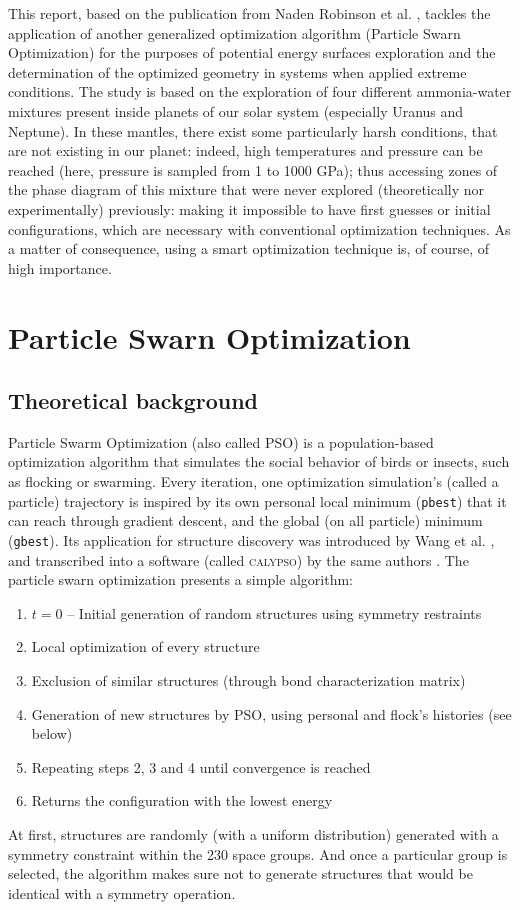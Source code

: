 \documentclass[11pt]{article}
\begin{document}
\begin{multicols}{2}
This report, based on the publication from Naden Robinson et al. \cite{original}, tackles the application of another generalized optimization algorithm (Particle Swarn Optimization) for the purposes of potential energy surfaces exploration and the determination of the optimized geometry in systems when applied extreme conditions. The study is based on the exploration of four different ammonia-water mixtures present inside planets of our solar system (especially Uranus and Neptune). In these mantles, there exist some particularly harsh conditions, that are not existing in our planet: indeed, high temperatures and pressure can be reached (here, pressure is sampled from 1 to 1000 GPa); thus accessing zones of the phase diagram of this mixture that were never explored (theoretically nor experimentally) previously: making it impossible to have first guesses or initial configurations, which are necessary with conventional optimization techniques. As a matter of consequence, using a smart optimization technique is, of course, of high importance.

\section*{Particle Swarn Optimization}
\subsection*{Theoretical background}
Particle Swarm Optimization (also called PSO) is a population-based optimization algorithm that simulates the social behavior of birds or insects, such as flocking or swarming. Every iteration, one optimization simulation's (called a particle) trajectory is inspired by its own personal local minimum (\verb+pbest+) that it can reach through gradient descent, and the global (on all particle) minimum (\verb+gbest+). Its application for structure discovery was introduced by Wang et al. \cite{PhysRevB.82.094116}, and transcribed into a software (called \textsc{calypso}) by the same authors \cite{WANG20122063}. The particle swarn optimization presents a simple algorithm:
\begin{enumerate}
\itemsep0em
    \item $t=0$ -- Initial generation of random structures using symmetry restraints
    \item Local optimization of every structure
    \item Exclusion of similar structures (through bond characterization matrix)
    \item Generation of new structures by PSO, using personal and flock's histories (see below)
    \item Repeating steps 2, 3 and 4 until convergence is reached
    \item Returns the configuration with the lowest energy
\end{enumerate}
At first, structures are randomly (with a uniform distribution) generated with a symmetry constraint within the 230 space groups. And once a particular group is selected, the algorithm makes sure not to generate structures that would be identical with a symmetry operation.


\end{multicols}
\end{document}
